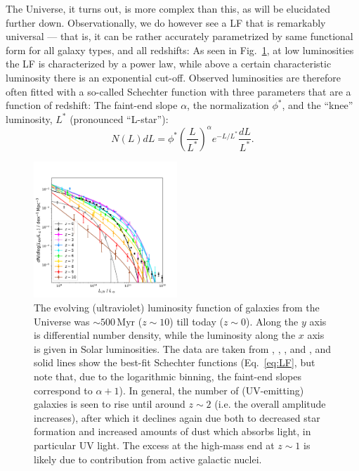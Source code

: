 \documentclass[useAMS]{aa}
\begin{document}
The Universe, it turns out, is more complex than this, as will be elucidated further down.
Observationally, we do however see a LF that is remarkably universal --- that is, it can be rather accurately parametrized by same functional form for all galaxy types, and all redshifts:
As seen in Fig.~\ref{fig:uvlf}, at low luminosities the LF is characterized by a power law, while above a certain characteristic luminosity there is an exponential cut-off.
Observed luminosities are therefore often fitted with a so-called Schechter function \citep{Schechter1976} with three parameters that are a function of redshift: The faint-end slope $\alpha$, the normalization $\phi^*$, and the ``knee'' luminosity, $L^*$ (pronounced ``L-star''):
\begin{equation}
    \label{eq:LF}
    N(L)dL=\phi^* \left({\frac{L}{L^*}}\right)^{\alpha} e^{-L/L^*}{\frac{dL}{L^*}}.
\end{equation}
\begin{figure}[!t]
    \centering
    \includegraphics [width=0.48\textwidth] {uvlf.pdf}
    \caption{The evolving (ultraviolet) luminosity function of galaxies from the Universe was $\sim500\,\mathrm{Myr}$ ($z\sim10$) till today ($z\sim0$).
    Along the $y$ axis is differential number density, while the luminosity along the $x$ axis is given in Solar luminosities.
    The data are taken from
    \citet[][$z\sim0$]{Wyder2005},
    \citet[][$z\sim1$]{Moutard2020},
    \citet[][$z\sim2\text{--}9$]{Bouwens2021}, and
    \citet[][$z\sim10$]{Oesch2018}, and solid lines show the best-fit Schechter functions (Eq.~\ref{eq:LF}, but note that, due to the logarithmic binning, the faint-end slopes correspond to $\alpha+1$).
    In general, the number of (UV-emitting) galaxies is seen to rise until around $z\sim2$ (i.e. the overall amplitude increases), after which it declines again due both to decreased star formation and increased amounts of dust which absorbs light, in particular UV light.
    The excess at the high-mass end at $z\sim1$ is likely due to contribution from active galactic nuclei.}
    \label{fig:uvlf}
\end{figure}
\end{document}
